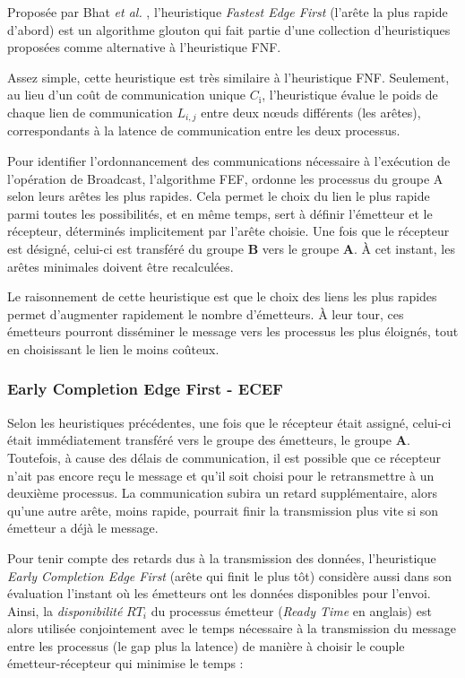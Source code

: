 Proposée par Bhat \emph{et al.} \cite{Bhat03}, l'heuristique \emph{Fastest
	Edge First} (l'arête la plus rapide d'abord) est un algorithme glouton
qui fait partie d'une collection d'heuristiques proposées comme alternative
à l'heuristique FNF. 

Assez simple, cette heuristique est très similaire à l'heuristique
FNF. Seulement, au lieu d'un coût de communication unique $C_{\textrm{i}}$,
l'heuristique évalue le poids de chaque lien de communication $L_{i,j}$
entre deux n{\oe}uds différents (les arêtes), correspondants à la latence
de communication entre les deux processus. 

Pour identifier l'ordonnancement des communications nécessaire à l'exécution
de l'opération de Broadcast, l'algorithme FEF, ordonne les processus
du groupe A selon leurs arêtes les plus rapides. Cela permet le choix
du lien le plus rapide parmi toutes les possibilités, et en même temps,
sert à définir l'émetteur et le récepteur, déterminés implicitement
par l'arête choisie. Une fois que le récepteur est désigné, celui-ci
est transféré du groupe \textbf{B} vers le groupe \textbf{A}. À cet
instant, les arêtes minimales doivent être recalculées.

Le raisonnement de cette heuristique est que le choix des liens les
plus rapides permet d'augmenter rapidement le nombre d'émetteurs.
À leur tour, ces émetteurs pourront disséminer le message vers les
processus les plus éloignés, tout en choisissant le lien le moins
coûteux.


\subsubsection*{Early Completion Edge First - ECEF}

Selon les heuristiques précédentes, une fois que le récepteur était
assigné, celui-ci était immédiatement transféré vers le groupe des
émetteurs, le groupe \textbf{A}. Toutefois, à cause des délais de
communication, il est possible que ce récepteur n'ait pas encore reçu
le message et qu'il soit choisi pour le retransmettre à un deuxième
processus. La communication subira un retard supplémentaire, alors
qu'une autre arête, moins rapide, pourrait finir la transmission plus
vite si son émetteur a déjà le message. 

Pour tenir compte des retards dus à la transmission des données, l'heuristique
\emph{Early Completion Edge First} (arête qui finit le plus tôt) considère
aussi dans son évaluation l'instant où les émetteurs ont les données
disponibles pour l'envoi. Ainsi, la \emph{disponibilité} $RT_{i}$
du processus émetteur (\emph{Ready Time} en anglais) est alors utilisée
conjointement avec le temps nécessaire à la transmission du message
entre les processus (le gap plus la latence) de manière à choisir
le couple émetteur-récepteur qui minimise le temps : 


